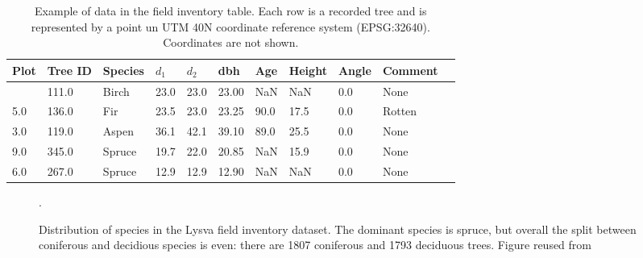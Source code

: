 \begin{longtable}[]{@{}lllllllllll@{}}

\caption[Example of data in the field inventory table.]{\label{tbl-inventory-example}Example of data in the field
inventory table. Each row is a recorded tree and is represented by a point un UTM 40N coordinate reference system (EPSG:32640). Coordinates are not shown.}

\tabularnewline

\toprule\noalign{}
Plot & Tree ID & Species & $d_1$ & $d_2$ & dbh & Age & Height & Angle &
Comment \\
\midrule\noalign{}
\endhead
\bottomrule\noalign{}
\endlastfoot
7.0 & 111.0 & Birch & 23.0 & 23.0 & 23.00 & NaN & NaN & 0.0 & None \\
5.0 & 136.0 & Fir & 23.5 & 23.0 & 23.25 & 90.0 & 17.5 & 0.0 & Rotten \\
3.0 & 119.0 & Aspen & 36.1 & 42.1 & 39.10 & 89.0 & 25.5 & 0.0 & None \\
9.0 & 345.0 & Spruce & 19.7 & 22.0 & 20.85 & NaN & 15.9 & 0.0 & None \\
6.0 & 267.0 & Spruce & 12.9 & 12.9 & 12.90 & NaN & NaN & 0.0 & None \\

\end{longtable}

\begin{figure}
\caption[Distribution of species in the Lysva field inventory dataset]{\label{fig-lysva-species-distribution}Distribution of species
in the Lysva field inventory dataset. The dominant species is spruce,
but overall the split between coniferous and decidious species is even:
there are 1807 coniferous and 1793 deciduous trees.
Figure reused from \citet{dubrovinOpenDatasetIndividual2024}}.
\end{figure}

